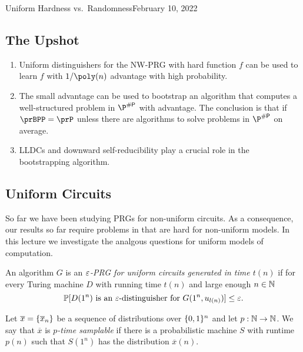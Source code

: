 \begin{lecture}{4}{Uniform Hardness vs.\ Randomness}{February 10, 2022}
\label{lec:04}

\subsection*{The Upshot}

\begin{enumerate}
  \item Uniform distinguishers for the NW-PRG with hard function $f$ can be
    used to learn $f$ with $1/\poly(n)$ advantage with high probability.
  \item The small advantage can be used to bootstrap an algorithm that computes
    a well-structured problem in $\P^{\sharpp}$ with advantage. The conclusion is
    that if $\prBPP = \prP$ unless there are algorithms to solve problems in
    $\P^{\sharpp}$ on average. 
  \item LLDCs and downward self-reducibility play a crucial role in the
    bootstrapping algorithm.
\end{enumerate}


\subsection{Uniform Circuits}

So far we have been studying PRGs for non-uniform circuits. As a consequence,
our results so far require problems in \E that are hard for non-uniform models.
In this lecture we investigate the analgous questions for uniform models of
computation.


\begin{definition}
  An algorithm $G$ is an \emph{$\varepsilon$-PRG for uniform circuits generated in
  time $t(n)$} if for every Turing machine $D$ with running time $t(n)$ and
  large enough $n \in \mathbb{N}$
	\[
		\mathbb{P}[D(1^n) \text{ is an $\varepsilon$-distinguisher for } G(1^n, u_{l(n)})] \leq \varepsilon.
	\]
\end{definition}

\begin{definition}
  Let $\overline{x} = \{\overline{x}_n\}$ be a sequence of distributions over
  $\{0, 1\}^n$ and let $p : \mathbb{N} \to \mathbb{N}$. We say that $\overline{x}$ is
  \emph{$p$-time samplable} if there is a probabilistic machine $S$ with
  runtime $p(n)$ such that $S(1^n)$ has the distribution $\overline{x}(n)$.
\end{definition}


\end{lecture}
